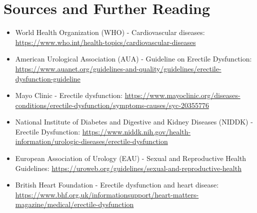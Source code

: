 \section*{Sources and Further Reading}
\begin{itemize}
    \item World Health Organization (WHO) - Cardiovascular diseases: \url{https://www.who.int/health-topics/cardiovascular-diseases}
    \item American Urological Association (AUA) - Guideline on Erectile Dysfunction: \url{https://www.auanet.org/guidelines-and-quality/guidelines/erectile-dysfunction-guideline}
    \item Mayo Clinic - Erectile dysfunction: \url{https://www.mayoclinic.org/diseases-conditions/erectile-dysfunction/symptoms-causes/syc-20355776}
    \item National Institute of Diabetes and Digestive and Kidney Diseases (NIDDK) - Erectile Dysfunction: \url{https://www.niddk.nih.gov/health-information/urologic-diseases/erectile-dysfunction}
    \item European Association of Urology (EAU) - Sexual and Reproductive Health Guidelines: \url{https://uroweb.org/guidelines/sexual-and-reproductive-health}
    \item British Heart Foundation - Erectile dysfunction and heart disease: \url{https://www.bhf.org.uk/informationsupport/heart-matters-magazine/medical/erectile-dysfunction}
\end{itemize}